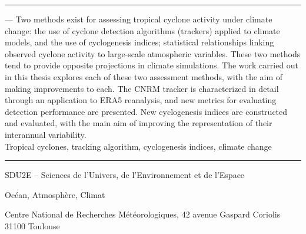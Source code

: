 \documentclass[../main.tex]{subfiles}
\begin{document}
\vspace{1cm}
\noindent\rule[2pt]{\textwidth}{0.5pt}
 --- Two methods exist for assessing tropical cyclone activity under climate change: the use of cyclone detection
algorithms (trackers) applied to climate models, and the use of cyclogenesis indices; statistical relationships linking observed cyclone activity to large-scale
atmospheric variables. These two methods tend to provide opposite projections in climate simulations. The work carried out in this thesis explores each of
these two assessment methods, with the aim of making improvements to each. The CNRM tracker is characterized in detail through an application to ERA5
reanalysis, and new metrics for evaluating detection performance are presented. New cyclogenesis indices are constructed and evaluated, with the main aim of
improving the representation of their interannual variability.\\
    Tropical cyclones, tracking algorithm, cyclogenesis indices, climate change
\\
\noindent\rule[2pt]{\textwidth}{0.5pt}

\vspace{1cm}
SDU2E -- Sciences de l'Univers, de l'Environnement et de l'Espace

Océan, Atmosphère, Climat
\\

\vspace{5mm}
\begin{center}
  Centre National de Recherches Météorologiques, 42 avenue Gaspard Coriolis\\
  31100 Toulouse
\end{center}
\end{document}
